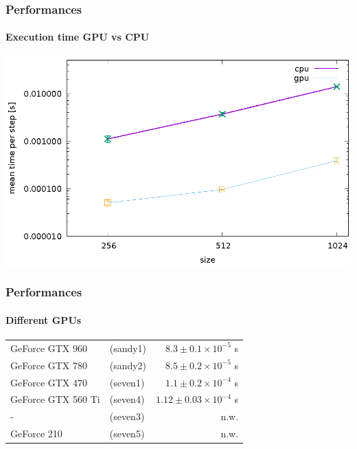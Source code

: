 \begin{frame}
\frametitle{Performances}
\framesubtitle{Execution time GPU vs CPU}
\begin{center}
\includegraphics[width = \textwidth]{../check/cpu/speed.eps}
\end{center}
\end{frame}

\begin{frame}
\frametitle{Performances}
\framesubtitle{Different GPUs}
\begin{center}
\begin{tabular}{l l r}
GeForce GTX 960		&	(sandy1)	&	$8.3\pm0.1\times10^{-5}$ s\\
GeForce GTX 780		&	(sandy2)	&	$8.5\pm0.2\times10^{-5}$ s\\
GeForce GTX 470		&	(seven1)	&	$1.1\pm0.2\times10^{-4}$ s\\
GeForce GTX 560 Ti	&	(seven4)	&	$1.12\pm0.03\times10^{-4}$ s\\
-	&	(seven3)	&	n.w.\\
GeForce 210			&	(seven5)	&	n.w.\\
\end{tabular}
\end{center}
\end{frame}
